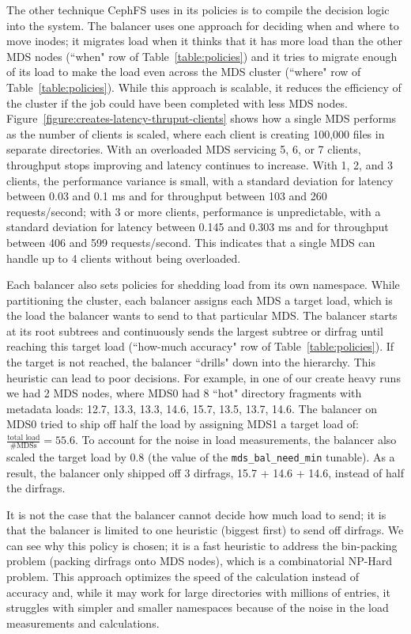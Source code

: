 The other technique CephFS uses in its policies is to compile the decision logic into the system. The balancer uses one approach for deciding when and where to move inodes; it migrates load when it thinks that it has more load than the other MDS nodes (``when" row of Table~\ref{table:policies}) and it tries to migrate enough of its load to make the load even across the MDS cluster (``where" row of Table~\ref{table:policies}). While this approach is scalable, it reduces the efficiency of the cluster if the job could have been completed with less MDS nodes. Figure~\ref{figure:creates-latency-thruput-clients} shows how a single MDS performs as the number of clients is scaled, where each client is creating 100,000 files in separate directories. With an overloaded MDS servicing 5, 6, or 7 clients, throughput stops improving and latency continues to increase. With 1, 2, and 3 clients, the performance variance is small, with a standard deviation for latency between 0.03 and 0.1 ms and for throughput between 103 and 260 requests/second; with 3 or more clients, performance is unpredictable, with a standard deviation for latency between 0.145 and 0.303 ms and for throughput between 406 and 599 requests/second. This indicates that a single MDS can handle up to 4 clients without being overloaded.

Each balancer also sets policies for shedding load from its own namespace.  While partitioning the cluster, each balancer assigns each MDS a target load, which is the load the balancer wants to send to that particular MDS. The balancer starts at its root subtrees and continuously sends the largest subtree or dirfrag until reaching this target load (``how-much accuracy" row of Table~\ref{table:policies}). If the target is not reached, the balancer ``drills" down into the hierarchy. This heuristic can lead to poor decisions. For example, in one of our create heavy runs we had 2 MDS nodes, where MDS0 had 8 ``hot" directory fragments with metadata loads: 12.7, 13.3, 13.3, 14.6, 15.7, 13.5, 13.7, 14.6. The balancer on MDS0 tried to ship off half the load by assigning MDS1 a target load of:
\(\frac{\text{total load}}{\text{\# MDSs}} = 55.6\). 
To account for the noise in load measurements, the balancer also scaled the target load by 0.8 (the value of the \texttt{mds\_bal\_need\_min} tunable). As a result, the balancer only shipped off 3 dirfrags, 15.7 + 14.6 + 14.6, instead of half the dirfrags. 

It is not the case that the balancer cannot decide how much load to send; it is that the balancer is limited to one heuristic (biggest first) to send off dirfrags. We can see why this policy is chosen; it is a fast heuristic to address the bin-packing problem (packing dirfrags onto MDS nodes), which is a combinatorial NP-Hard problem. This approach optimizes the speed of the calculation instead of accuracy and, while it may work for large directories with millions of entries, it struggles with simpler and smaller namespaces because of the noise in the load measurements and calculations.


